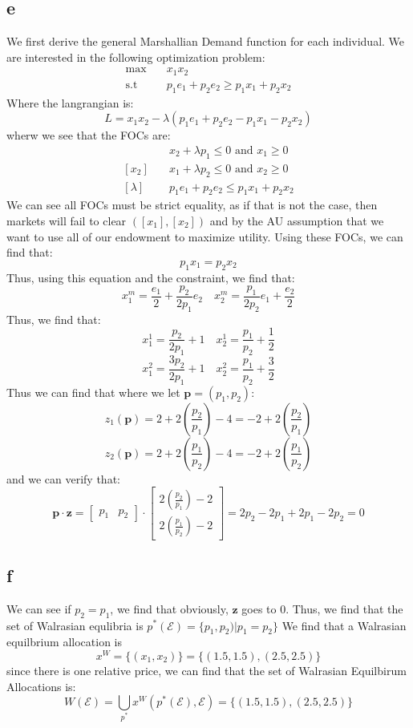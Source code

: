 \documentclass[11pt]{article}
\newcommand{\st}{\text{s.t}}
\begin{document}
\subsection*{e}
We first derive the general Marshallian Demand function for each individual. We are interested in the following optimization problem:
\begin{align*}
    \max & \quad x_1x_2\\
    \st & \quad p_1e_1 + p_2e_2 \geq p_1x_1 + p_2x_2
\end{align*}
Where the langrangian is:
\[
L = x_1x_2 - \lambda(p_1e_1 + p_2e_2 - p_1x_1 - p_2x_2)
\]
wherw we see that the FOCs are:
\begin{align*}
    [x_1] &\quad x_2 + \lambda p_1 \leq 0 \text{ and } x_1 \geq 0\\
    [x_2] & \quad x_1 + \lambda p_2 \leq 0 \text{ and } x_2 \geq 0\\
    [\lambda] &\quad p_1e_1 + p_2e_2 \leq p_1 x_1 + p_2x_2 
\end{align*}
We can see all FOCs must be strict equality, as if that is not the case, then markets will fail to clear $([x_1], [x_2])$ and by the AU assumption that we want to use all of our endowment to maximize utility. Using these FOCs, we can find that:
\[
p_1x_1 = p_2x_2
\]
Thus, using this equation and the constraint, we find that:
\[
x_1^m = \frac{e_1}{2} + \frac{p_2}{2p_1}e_2 \quad x_2^m = \frac{p_1}{2p_2}e_1 + \frac{e_2}{2}
\]
Thus, we find that:
\[
x_1^1 = \frac{p_2}{2p_1} + 1 \quad x_2^1 = \frac{p_1}{p_2} + \frac{1}{2}
\]
\[
x_1^2 = \frac{3p_2}{2p_1} + 1 \quad x_2^2 = \frac{p_1}{p_2} + \frac{3}{2}
\]
Thus we can find that where we let $\mathbf{p} = (p_1, p_2)$:
\[
z_1(\mathbf{p}) = 2 + 2 \left( \frac{p_2}{p_1} \right)  - 4 =  - 2 + 2 \left( \frac{p_2}{p_1} \right) 
\]
\[
z_2(\mathbf{p}) = 2 + 2 \left( \frac{p_1}{p_2} \right)  - 4 =  - 2 + 2 \left( \frac{p_1}{p_2} \right) 
\]
and we can verify that:
\[
\mathbf{p} \cdot \mathbf{z} = \begin{bmatrix}
    p_1 & p_2 
\end{bmatrix} \cdot 
\begin{bmatrix}
    2 \left( \frac{p_2}{p_1} \right) - 2\\ 
    2 \left( \frac{p_1}{p_2} \right) - 2
\end{bmatrix} = 2p_2 - 2p_1 + 2p_1 - 2p_2 = 0
\]
\subsection*{f}
We can see if $p_2 = p_1$, we find that obviously, $\mathbf{z}$ goes to 0. Thus, we find that the set of Walrasian equlibria is $p^*(\mathcal{E}) = \{p_1, p_2) | p_1 = p_2\}$ We find that a Walrasian equilbrium allocation is
\[
x^W =\{ (x_1, x_2)\} = \{ (1.5, 1.5), (2.5, 2.5)\}
\]
since there is one relative price, we can find that the set of Walrasian Equilbirum Allocations is: 
\[
W(\mathcal{E}) = \bigcup_{p^*} x^W(p^*(\mathcal{E}), \mathcal{E})  = \{ (1.5, 1.5), (2.5, 2.5)\}
\]
\end{document}
